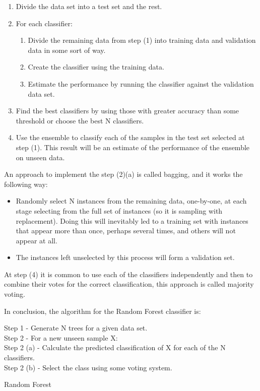 \begin{enumerate}
    \item Divide the data set into a test set and the rest.
    \item For each classifier:
        \begin{enumerate}
        \item Divide the remaining data from step (1) into training data and validation data in some sort of way.
        \item Create the classifier using the training data.
        \item Estimate the performance by running the classifier against the validation data set.
    \end{enumerate}
    \item Find the best classifiers by using those with greater accuracy than some threshold or choose the best N classifiers.
    \item Use the ensemble to classify each of the samples in the test set selected at step (1). This result will be an estimate of the performance of the ensemble on unseen data.
\end{enumerate}

An approach to implement the step (2)(a) is called bagging, and it works the following way:

\begin{itemize}
    \item Randomly select N instances from the remaining data, one-by-one, at each stage selecting from the full set of instances (so it is sampling with replacement). Doing this will inevitably led to a training set with instances that appear more than once, perhaps several times, and others will not appear at all.
    \item The instances left unselected by this process will form a validation set.
\end{itemize}

At step (4) it is common to use each of the classifiers independently and then to combine their votes for the correct classification, this approach is called majority voting.

In conclusion, the algorithm for the Random Forest classifier is:

\begin{algorithm}[H]
Step 1 - Generate N trees for a given data set. \\
Step 2 - For a new unseen sample X: \\
Step 2 (a) - Calculate the predicted classification of X for each of the N classifiers. \\
Step 2 (b) - Select the class using some voting system.
\caption{Random Forest}
\end{algorithm}


